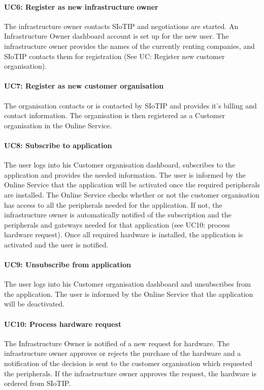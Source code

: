 \documentclass[english]{sareport}
\begin{document}
\paragraph{UC6: Register as new infrastructure owner}
The infrastructure owner contacts SIoTIP and negotiations are started. An Infrastructure Owner dashboard account is set up for the new user. The infrastructure owner provides the names of the currently renting companies, and SIoTIP contacts them for registration (See UC: Register new customer organisation).

\paragraph{UC7: Register as new customer organisation}
The organisation contacts or is contacted by SIoTIP and provides it's billing and contact information. The organisation is then registered as a Customer organisation in the Online Service.

\paragraph{UC8: Subscribe to application}
The user logs into his Customer organisation dashboard, subscribes to the application and provides the needed information. The user is informed by the Online Service that the application will be activated once the required peripherals are installed. The Online Service checks whether or not the customer organisation has access to all the peripherals needed for the application. If not, the infrastructure owner is automatically notified of the subscription and the peripherals and gateways needed for that application (see UC10: process hardware request). Once all required hardware is installed, the application is activated and the user is notified.

\paragraph{UC9: Unsubscribe from application}
The user logs into his Customer organisation dashboard and unsubscribes from the application. The user is informed by the Online Service that the application will be deactivated.

\paragraph{UC10: Process hardware request}
The Infrastructure Owner is notified of a new request for hardware. The infrastructure owner approves or rejects the purchase of the hardware and a notification of the decision is sent to the customer organisation which requested the peripherals. If the infrastructure owner approves the request, the hardware is ordered from SIoTIP.
\end{document}
